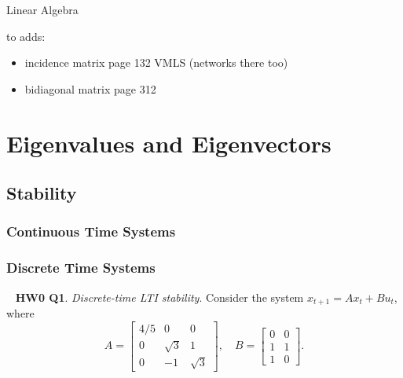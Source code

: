 \begin{chapter}{Linear Algebra}
        
        
        
        
        
    
    to adds:
    \begin{itemize}
        \item incidence matrix page 132 VMLS (networks there too)
        \item bidiagonal matrix page 312~\cite{boyd_convex_optimization}
    \end{itemize}







    \section{Eigenvalues and Eigenvectors}

    \subsection{Stability}

    \subsubsection{Continuous Time Systems}

    \subsubsection{Discrete Time Systems}

    ~\cite{AA203} \textbf{HW0 Q1}. \textit{Discrete-time LTI stability}. Consider the system $x_{t+1} = Ax_t + Bu_t$, where
    \[A = \begin{bmatrix}
        4/5 & 0 & 0 \\
        0 & \sqrt{3} & 1 \\
        0 & -1 & \sqrt{3}
    \end{bmatrix}, \quad 
    B = \begin{bmatrix}
        0 & 0 \\ 1 & 1 \\ 1 & 0
    \end{bmatrix}.
    \]


\end{chapter}
